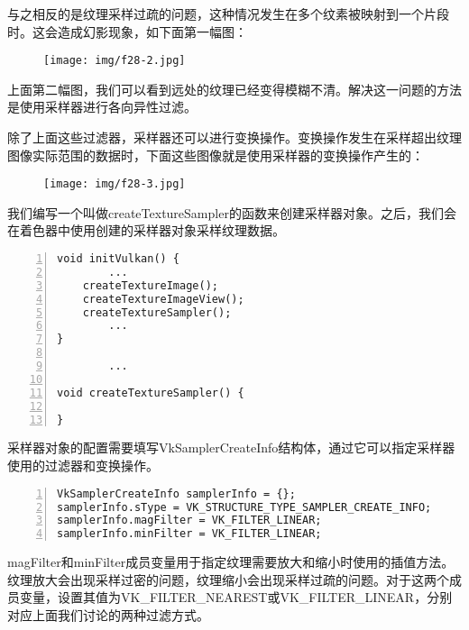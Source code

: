 \documentclass{ctexart}
\begin{document}
与之相反的是纹理采样过疏的问题，这种情况发生在多个纹素被映射到一个片段时。这会造成幻影现象，如下面第一幅图：

\begin{figure}[H]
	\centering
	\texttt{[image: img/f28-2.jpg]}
\end{figure}

上面第二幅图，我们可以看到远处的纹理已经变得模糊不清。解决这一问题的方法是使用采样器进行各向异性过滤。

除了上面这些过滤器，采样器还可以进行变换操作。变换操作发生在采样超出纹理图像实际范围的数据时，下面这些图像就是使用采样器的变换操作产生的：

\begin{figure}[H]
	\centering
	\texttt{[image: img/f28-3.jpg]}
\end{figure}

我们编写一个叫做createTextureSampler的函数来创建采样器对象。之后，我们会在着色器中使用创建的采样器对象采样纹理数据。

\begin{lstlisting}[language={[ANSI]C},keywordstyle=\color{blue!70},commentstyle=\color{red!50!green!50!blue!50},frame=shadowbox, rulesepcolor=\color{red!20!green!20!blue!20},basicstyle=\small,numbers=left, numberstyle=\tiny,breaklines=true]
void initVulkan() {
		...
	createTextureImage();
	createTextureImageView();
	createTextureSampler();
		...
}

		...

void createTextureSampler() {

}
\end{lstlisting}

采样器对象的配置需要填写VkSamplerCreateInfo结构体，通过它可以指定采样器使用的过滤器和变换操作。

\begin{lstlisting}[language={[ANSI]C},keywordstyle=\color{blue!70},commentstyle=\color{red!50!green!50!blue!50},frame=shadowbox, rulesepcolor=\color{red!20!green!20!blue!20},basicstyle=\small,numbers=left, numberstyle=\tiny,breaklines=true]
VkSamplerCreateInfo samplerInfo = {};
samplerInfo.sType = VK_STRUCTURE_TYPE_SAMPLER_CREATE_INFO;
samplerInfo.magFilter = VK_FILTER_LINEAR;
samplerInfo.minFilter = VK_FILTER_LINEAR;
\end{lstlisting}

magFilter和minFilter成员变量用于指定纹理需要放大和缩小时使用的插值方法。纹理放大会出现采样过密的问题，纹理缩小会出现采样过疏的问题。对于这两个成员变量，设置其值为VK\_FILTER\_NEAREST或VK\_FILTER\_LINEAR，分别对应上面我们讨论的两种过滤方式。
\end{document}
